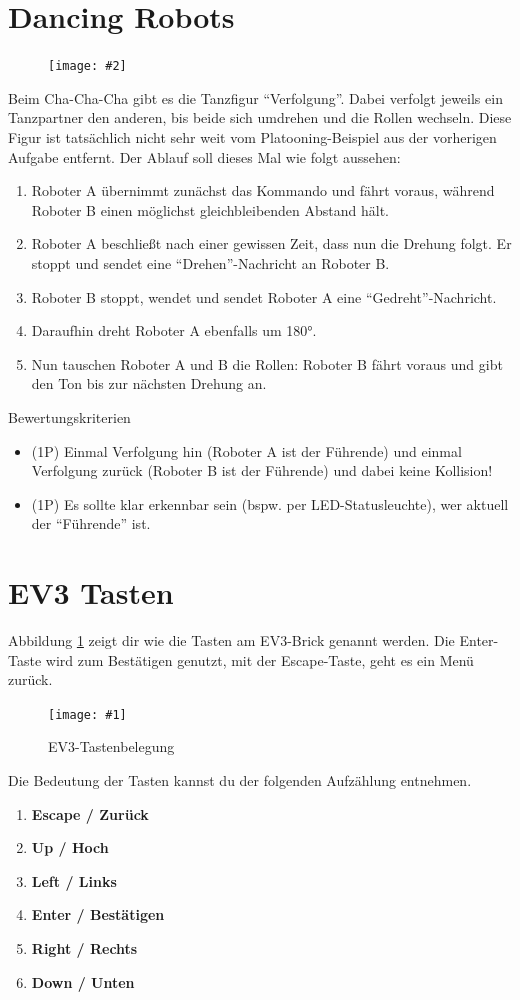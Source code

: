 \documentclass[
	12pt,
	colorbacktitle,
	accentcolor=tud1c,
	draft,
	twoside,
	german
]{tudexercise}
\newcommand{\gcenter}[4]{
	\begin{figure}[h]
	\centering 
	\texttt{[image: \#1]}
	\caption{#2}
	\label{fig:#3}
	\end{figure}
}
\newcommand{\easygcenter}[2]{
	\begin{figure}[h]
	\centering 
	\texttt{[image: \#2]}
	\end{figure}
}
\begin{document}
	\newpage
	\section{Dancing Robots}
	\easygcenter{.8\textwidth}{img/task_chachacha.png}
	Beim Cha-Cha-Cha gibt es die Tanzfigur “Verfolgung”. Dabei verfolgt jeweils ein Tanzpartner den anderen, bis beide sich umdrehen und die Rollen wechseln. Diese Figur ist tatsächlich nicht sehr weit vom Platooning-Beispiel aus der vorherigen Aufgabe entfernt.
	Der Ablauf soll dieses Mal wie folgt aussehen:
	\begin{enumerate}
	\item  Roboter A übernimmt zunächst das Kommando und fährt voraus, während Roboter B einen möglichst gleichbleibenden Abstand hält.
	\item  Roboter A beschließt nach einer gewissen Zeit, dass nun die Drehung folgt. Er stoppt und sendet eine “Drehen”-Nachricht an Roboter B.
	\item  Roboter B stoppt, wendet und sendet Roboter A eine “Gedreht”-Nachricht.
	\item  Daraufhin dreht Roboter A ebenfalls um 180°.
	\item  Nun tauschen Roboter A und B die Rollen: Roboter B fährt voraus und gibt den Ton bis zur nächsten Drehung an.
	\end{enumerate}
	Bewertungskriterien
	\begin{itemize}
	\item (1P) Einmal Verfolgung hin (Roboter A ist der Führende) und einmal Verfolgung zurück (Roboter B ist der Führende) und dabei keine Kollision!
	\item (1P) Es sollte klar erkennbar sein (bspw. per LED-Statusleuchte), wer aktuell der “Führende” ist.
	\end{itemize}
	
	\newpage
	
	\appendix
	\section{EV3 Tasten}
	Abbildung \ref{fig:buttons} zeigt dir wie die Tasten am EV3-Brick genannt werden. Die Enter-Taste wird zum Bestätigen genutzt, mit der Escape-Taste, geht es ein Menü zurück. 
		\gcenter{img/ev3_buttons.png}{EV3-Tastenbelegung\protect\footnotemark\ }{buttons}{.5\textwidth}
		
	Die Bedeutung der Tasten kannst du der folgenden Aufzählung entnehmen. 
	\begin{enumerate}
	\item \textbf{Escape / Zurück}
	\item \textbf{Up / Hoch}
	\item \textbf{Left / Links}
	\item \textbf{Enter / Bestätigen}
	\item \textbf{Right / Rechts}  
	\item \textbf{Down / Unten}  
	\end{enumerate}
	\newpage
\end{document}
